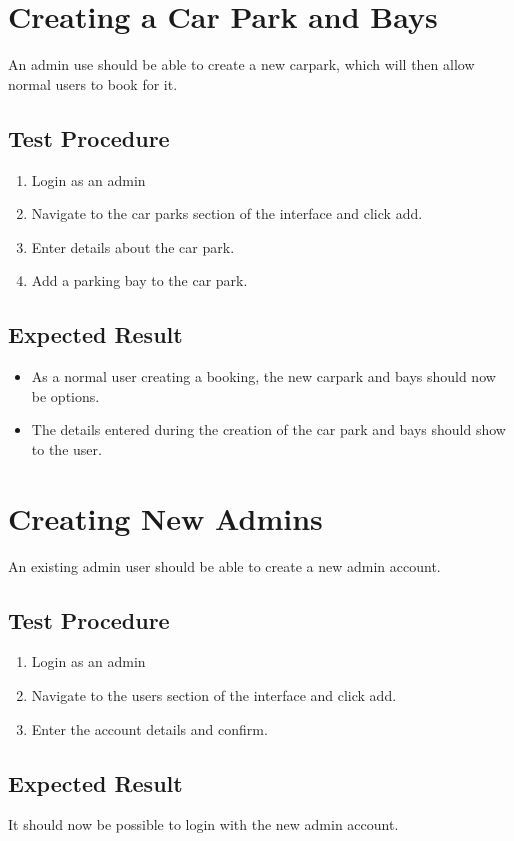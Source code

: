 \documentclass[a4paper, draft]{article}
\begin{document}
\newpage
\section{Creating a Car Park and Bays}
An admin use should be able to create a new carpark, which will then allow normal users to book for it.

\subsection{Test Procedure}
\begin{enumerate}
    \item Login as an admin
    \item Navigate to the car parks section of the interface and click add.
    \item Enter details about the car park.
    \item Add a parking bay to the car park.
\end{enumerate}

\subsection{Expected Result}
\begin{itemize}
    \item As a normal user creating a booking, the new carpark and bays should now be options.
    \item The details entered during the creation of the car park and bays should show to the user.
\end{itemize}

\section{Creating New Admins}
An existing admin user should be able to create a new admin account.

\subsection{Test Procedure}
\begin{enumerate}
    \item Login as an admin
    \item Navigate to the users section of the interface and click add.
    \item Enter the account details and confirm.
\end{enumerate}

\subsection{Expected Result}
It should now be possible to login with the new admin account.
\end{document}
